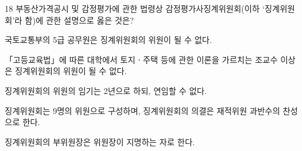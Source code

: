 \begin{question}{18}
부동산가격공시 및 감정평가에 관한 법령상 감정평가사징계위원회(이하 ‘징계위원회’라 함)에 관한 설명으로 옳은 것은?
\begin{choices}
  \item 국토교통부의 5급 공무원은 징계위원회의 위원이 될 수 없다.
  \item 「고등교육법」에 따른 대학에서 토지ㆍ주택 등에 관한 이론을 가르치는 조교수 이상은 징계위원회의 위원이 될 수 없다.
  \item 징계위원회의 위원의 임기는 2년으로 하되, 연임할 수 없다.
  \item 징계위원회는 9명의 위원으로 구성하며, 징계위원회의 의결은 재적위원 과반수의 찬성으로 한다.
  \item 징계위원회의 부위원장은 위원장이 지명하는 자로 한다.
\end{choices}
\end{question}
